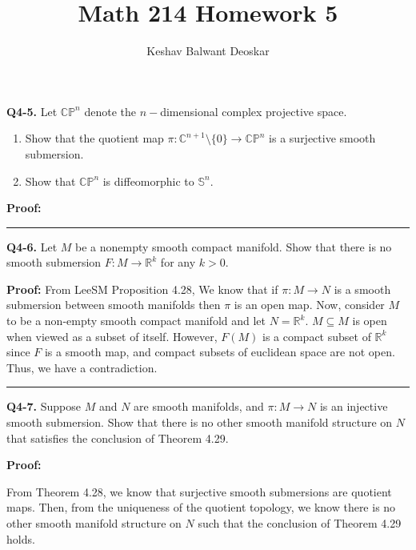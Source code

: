 \documentclass{article}
\title{Math 214 Homework 5}
\author{Keshav Balwant Deoskar}
\newcommand{\R}{\mathbb{R}}
\newcommand{\C}{\mathbb{C}}
\begin{document}
\maketitle



\textbf{Q4-5.} Let $\mathbb{CP}^n$ denote the $n-$dimensional complex projective space. 
\begin{enumerate}[label=(\alph*)]
  \item Show that the quotient map $\pi : \C^{n+1} \setminus \{0\} \rightarrow \mathbb{CP}^n$ is a surjective smooth submersion.
  \item Show that $\mathbb{CP}^n$ is diffeomorphic to $\mathbb{S}^n$.
\end{enumerate}

\vskip 0.5cm
\textbf{Proof:}

\vskip 0.5cm
\hrule 
\vskip 0.5cm



\textbf{Q4-6.} Let $M$ be a nonempty smooth compact manifold. Show that there is no smooth submersion $F : M \rightarrow \R^{k}$ for any $k > 0$. 

\vskip 0.5cm
\textbf{Proof:}
From LeeSM Proposition 4.28, We know that if $\pi : M \rightarrow N$ is a smooth submersion between smooth manifolds then $\pi$ is an open map. Now, consider $M$ to be a non-empty smooth compact manifold and let $N = \R^k$. $M \subseteq M$ is open when viewed as a subset of itself. However, $F(M)$ is a compact subset of $\R^k$ since $F$ is a smooth map, and compact subsets of euclidean space are not open. Thus, we have a contradiction.

\vskip 0.5cm
\hrule 
\vskip 0.5cm



\textbf{Q4-7.} Suppose $M$ and $N$ are smooth manifolds, and $\pi : M \rightarrow N$ is an injective smooth submersion. Show that there is no other smooth manifold structure on $N$ that satisfies the conclusion of Theorem 4.29. 

\vskip 0.5cm
\textbf{Proof:}

From Theorem 4.28, we know that surjective smooth submersions are quotient maps. Then, from the uniqueness of the quotient topology, we know there is no other smooth manifold structure on $N$ such that the conclusion of Theorem 4.29 holds.
\end{document}
